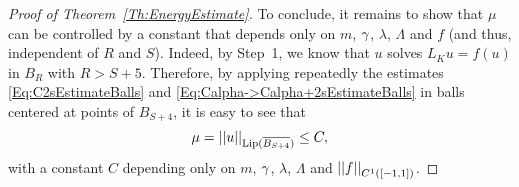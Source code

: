 \begin{proof}[Proof of Theorem~\ref{Th:EnergyEstimate}]
To conclude, it remains to show that $\mu$ can be controlled by a constant that depends only on $m$, $\gamma$, $\lambda$, $\Lambda$ and $f$ (and thus, independent of $R$ and $S$). Indeed, by Step~1, we know that $u$ solves $L_K u = f(u)$ in $B_R$ with $R> S+5$. Therefore, by applying repeatedly the estimates \eqref{Eq:C2sEstimateBalls} and \eqref{Eq:Calpha->Calpha+2sEstimateBalls} in balls centered at points of $B_{S+4}$, it is easy to see that
$$
\mu = \left | \left |{u} \right | \right |_{\mathrm{Lip}(\overline{B_{S+4}})} \leq C,
$$ 
with a constant $C$ depending only on $m$, $\gamma$, $\lambda$, $\Lambda$ and $\left | \left |{f} \right | \right |_{C^1([-1,1])}$.
\end{proof}
